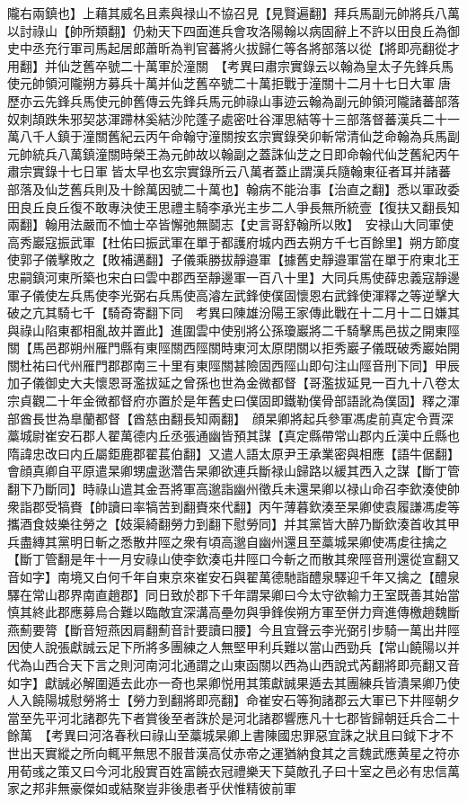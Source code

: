 隴右兩鎮也】上藉其威名且素與禄山不協召見【見賢遍翻】拜兵馬副元帥將兵八萬以討祿山【帥所類翻】仍勑天下四面進兵會攻洛陽翰以病固辭上不許以田良丘為御史中丞充行軍司馬起居郎蕭昕為判官蕃將火拔歸仁等各將部落以從【將即亮翻從才用翻】并仙芝舊卒號二十萬軍於潼關　【考異曰肅宗實錄云以翰為皇太子先鋒兵馬使元帥領河隴朔方募兵十萬并仙芝舊卒號二十萬拒戰于潼關十二月十七日大軍唐歷亦云先鋒兵馬使元帥舊傳云先鋒兵馬元帥祿山事迹云翰為副元帥領河隴諸蕃部落奴刺頡跌朱邪契苾渾蹛林奚結沙陀蓬子處密吐谷渾思結等十三部落督蕃漢兵二十一萬八千人鎮于潼關舊紀云丙午命翰守潼關按玄宗實錄癸卯斬常清仙芝命翰為兵馬副元帥統兵八萬鎮潼關時榮王為元帥故以翰副之蓋誅仙芝之日即命翰代仙芝舊紀丙午肅宗實錄十七日軍皆太早也玄宗實錄所云八萬者蓋止謂漢兵隨翰東征者耳并諸蕃部落及仙芝舊兵則及十餘萬因號二十萬也】翰病不能治事【治直之翻】悉以軍政委田良丘良丘復不敢專決使王思禮主騎李承光主步二人爭長無所統壹【復扶又翻長知兩翻】翰用法嚴而不恤士卒皆懈弛無鬬志【史言哥舒翰所以敗】　安禄山大同軍使高秀巖寇振武軍【杜佑曰振武軍在單于都護府城内西去朔方千七百餘里】朔方節度使郭子儀擊敗之【敗補邁翻】子儀乘勝拔靜邉軍【據舊史靜邉軍當在單于府東北王忠嗣鎮河東所築也宋白曰雲中郡西至靜邊軍一百八十里】大同兵馬使薛忠義寇靜邊軍子儀使左兵馬使李光弼右兵馬使高濬左武鋒使僕固懷恩右武鋒使渾釋之等逆擊大破之亢其騎七千【騎奇寄翻下同　考異曰陳雄汾陽王家傳此戰在十二月十二日嫌其與祿山陷東都相亂故并置此】進圍雲中使别將公孫瓊巖將二千騎擊馬邑拔之開東陘關【馬邑郡朔州雁門縣有東陘關西陘關時東河太原閉關以拒秀巖子儀既破秀巖始開關杜祐曰代州雁門郡郡南三十里有東陘關甚險固西陘山即句注山陘音刑下同】甲辰加子儀御史大夫懷恩哥濫拔延之曾孫也世為金微都督【哥濫拔延見一百九十八卷太宗貞觀二十年金微都督府亦置於是年舊史曰僕固即鐵勒僕骨部語訛為僕固】釋之渾部酋長世為臯蘭都督【酋慈由翻長知兩翻】　顔杲卿將起兵參軍馮䖍前真定令賈深藁城尉崔安石郡人翟萬德内丘丞張通幽皆預其謀【真定縣帶常山郡内丘漢中丘縣也隋諱忠改曰内丘屬鉅鹿郡翟萇伯翻】又遣人語太原尹王承業密與相應【語牛倨翻】會顔真卿自平原遣杲卿甥盧逖濳告杲卿欲連兵斷禄山歸路以緩其西入之謀【斷丁管翻下乃斷同】時祿山遣其金吾將軍高邈詣幽州徵兵未還杲卿以禄山命召李欽湊使帥衆詣郡受犒賚【帥讀曰率犒苦到翻賚來代翻】丙午薄暮欽湊至杲卿使袁履謙馮䖍等攜酒食妓樂往勞之【妓渠綺翻勞力到翻下慰勞同】并其黨皆大醉乃斷欽湊首收其甲兵盡縳其黨明日斬之悉散井陘之衆有頃高邈自幽州還且至藁城杲卿使馮䖍往擒之【斷丁管翻是年十一月安祿山使李欽湊屯井陘口今斬之而散其衆陘音刑還從宣翻又音如字】南境又白何千年自東京來崔安石與翟萬德馳詣醴泉驛迎千年又擒之【醴泉驛在常山郡界南直趙郡】同日致於郡下千年謂杲卿曰今太守欲輸力王室既善其始當慎其終此郡應募烏合難以臨敵宜深溝高壘勿與爭鋒俟朔方軍至併力齊進傳檄趙魏斷燕薊要膂【斷音短燕因肩翻薊音計要讀曰腰】今且宜聲云李光弼引步騎一萬出井陘因使人說張獻誠云足下所將多團練之人無堅甲利兵難以當山西勁兵【常山饒陽以并代為山西合天下言之則河南河北通謂之山東函關以西為山西說式芮翻將即亮翻又音如字】獻誠必解圍遁去此亦一奇也杲卿悦用其策獻誠果遁去其團練兵皆潰杲卿乃使人入饒陽城慰勞將士【勞力到翻將即亮翻】命崔安石等狥諸郡云大軍已下井陘朝夕當至先平河北諸郡先下者賞後至者誅於是河北諸郡響應凡十七郡皆歸朝廷兵合二十餘萬　【考異曰河洛春秋曰祿山至藁城杲卿上書陳國忠罪惡宜誅之狀且曰鉞下才不世出天實縱之所向輒平無思不服昔漢高仗赤帝之運猶納食其之言魏武應黄星之符亦用荀彧之策又曰今河北殷實百姓富饒衣冠禮樂天下莫敵孔子曰十室之邑必有忠信萬家之邦非無豪傑如或結聚豈非後患者乎伏惟精彼前軍